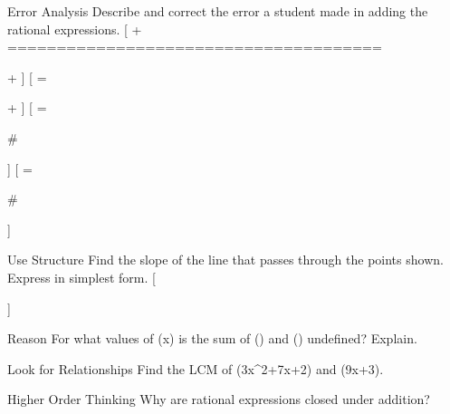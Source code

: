 \documentclass{article}
\newenvironment{practice}[2]{}{}
\newcommand{\answer}[1]{}
\begin{document}
\begin{practice}{13}{2}
Error Analysis Describe and correct the error a student made in adding the rational expressions.
[
+
======================================

+
]
[
=

+
]
[
=

# 

]
[
=

# 

]
\answer{When rewriting the second expression with a common denominator, the student should have had (x(x+1)(x+4)) in the numerator rather than (x(x+4)).}
\end{practice}

\begin{practice}{14}{3}
Use Structure Find the slope of the line that passes through the points shown. Express in simplest form.
[
]
\answer{1}
\end{practice}

\begin{practice}{15}{2}
Reason For what values of (x) is the sum of () and () undefined? Explain.
\answer{When (x=-y), the denominator is zero, which is undefined.}
\end{practice}

\begin{practice}{16}{2}
Look for Relationships Find the LCM of (3x^2+7x+2) and (9x+3).
\answer{(3(3x+1)(x+2))}
\end{practice}

\begin{practice}{17}{2}
Higher Order Thinking Why are rational expressions closed under addition?
\answer{You can find the sum of two rational expressions (\frac{p(x)}{q(x)}+\frac{r(x)}{t(x)}) by finding the sum of equivalent expressions, (\frac{p(x)\cdot t(x)}{q(x)\cdot t(x)}+\frac{r(x)\cdot q(x)}{t(x)\cdot q(x)}=\frac{p(x)\cdot t(x)+r(x)\cdot q(x)}{q(x)\cdot t(x)}). Since the numerator and denominator are still polynomials, the sum is a rational expression. So rational expressions are closed under addition.}
\end{practice}
\end{document}
